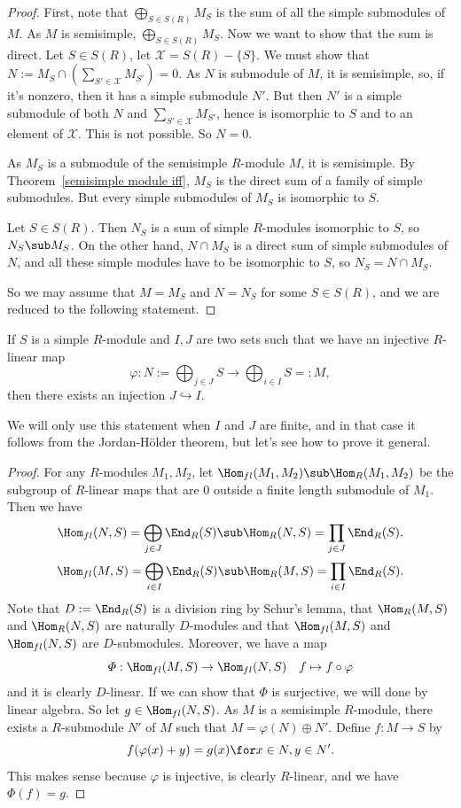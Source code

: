 \begin{proof}
First, note that $\bigoplus_{S\in S(R)}M_S$ is the sum of all the simple submodules of $M$. As $M$ is semisimple, $\bigoplus_{S\in S(R)}M_S$. Now we want to show that the sum is direct. Let $S\in S(R)$, let $\mathcal{X}=S(R)-\{S\}$. We must show that $N:=M_S\cap(\sum_{S'\in\mathcal{X}}M_{S'})=0$. As $N$ is submodule of $M$, it is semisimple, so, if it's nonzero, then it has a simple submodule $N'$. But then $N'$ is a simple submodule of both $N$ and $\sum_{S'\in\mathcal{X}}M_{S'}$, hence is isomorphic to $S$ and to an element of $\mathcal{X}$. This is not possible. So $N=0$.\par
As $M_S$ is a submodule of the semisimple $R$-module $M$, it is semisimple. By Theorem~\ref{semisimple module iff}, $M_S$ is the direct sum of a family of simple submodules. But every simple submodules of $M_S$ is isomorphic to $S$.\par
Let $S\in S(R)$. Then $N_S$ is a sum of simple $R$-modules isomorphic to $S$, so $N_S\sub M_S$. On the other hand, $N\cap M_S$ is a direct sum of simple submodules of $N$, and all these simple modules have to be isomorphic to $S$, so $N_S=N\cap M_S$.\par
So we may assume that $M=M_S$ and $N=N_S$ for some $S\in S(R)$, and we are reduced to the following statement.
\end{proof}
\begin{proposition}
If $S$ is a simple $R$-module and $I,J$ are two sets such that we have an injective $R$-linear map 
\[\varphi:N:=\bigoplus_{j\in J}S\to\bigoplus_{i\in I}S=:M,\]
then there exists an injection $J\hookrightarrow I$. 
\end{proposition}
We will only use this statement when $I$ and $J$ are finite, and in that case it follows from the Jordan-H\"older theorem, but let's see how to prove it general.
\begin{proof}
For any $R$-modules $M_1,M_2$, let $\Hom_{fl}(M_1,M_2)\sub\Hom_R(M_1,M_2)$ be the subgroup of $R$-linear maps that are $0$ outside a finite length submodule of $M_1$. Then we have
\[\Hom_{fl}(N,S)=\bigoplus_{j\in J}\End_R(S)\sub\Hom_R(N,S)=\prod_{j\in J}\End_R(S).\]
\[\Hom_{fl}(M,S)=\bigoplus_{i\in I}\End_R(S)\sub\Hom_R(M,S)=\prod_{i\in I}\End_R(S).\]
Note that $D:=\End_R(S)$ is a division ring by Schur's lemma, that $\Hom_R(M,S)$ and $\Hom_R(N,S)$ are naturally $D$-modules and that $\Hom_{fl}(M,S)$ and $\Hom_{fl}(N,S)$ are $D$-submodules. Moreover, we have a map
\[\varPhi:\Hom_{fl}(M,S)\to\Hom_{fl}(N,S)\quad f\mapsto f\circ\varphi\]
and it is clearly $D$-linear. If we can show that $\varPhi$ is surjective, we will done by linear algebra. So let $g\in\Hom_{fl}(N,S)$. As $M$ is a semisimple $R$-module, there exists a $R$-submodule $N'$ of $M$ such that $M=\varphi(N)\oplus N'$. Define $f:M\to S$ by 
\[f(\varphi(x)+y)=g(x)\for x\in N,y\in N'.\]
This makes sense because $\varphi$ is injective, is clearly $R$-linear, and we have $\varPhi(f)=g$.
\end{proof}
